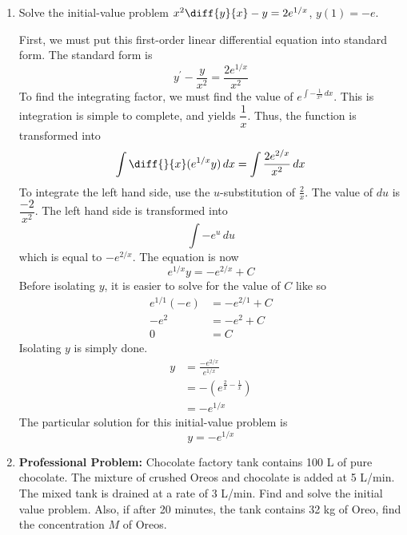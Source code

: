 \documentclass{article}
\begin{document}
\begin{enumerate}[label=\textbf{(3.\arabic*)}]
\newpage

\item Solve the initial-value problem $x^2\diff{y}{x}-y=2e^{1/x}$, $y(1)=-e$.

First, we must put this first-order linear differential equation into standard form. The standard form is
\[y^{\prime} - \frac{y}{x^2}=\frac{2e^{1/x}}{x^2}\]
To find the integrating factor, we must find the value of $\displaystyle e^{\int -\frac{1}{x^2}\,dx}$. This is integration is simple to complete, and yields $\dfrac{1}{x}$. Thus, the function is transformed into
\[\int\diff{ }{x}(e^{1/x}y)\,dx=\int\frac{2e^{2/x}}{x^2}\,dx\]
To integrate the left hand side, use the $u$-substitution of $\frac{2}{x}$. The value of $du$ is $\dfrac{-2}{x^2}$. The left hand side is transformed into 
\[\int -e^u\,du\]
which is equal to $-e^{2/x}$. The equation is now
\[e^{1/x}y=-e^{2/x}+C\]
Before isolating $y$, it is easier to solve for the value of $C$ like so
\begin{align*}
e^{1/1}(-e)&=-e^{2/1}+C\\
-e^2 &= -e^2+C\\
0 &= C
\end{align*}
Isolating $y$ is simply done.
\begin{align*}
y &= \frac{-e^{2/x}}{e^{1/x}}\\
&= -(e^{\frac{2}{x}-\frac{1}{x}})\\
&= -e^{1/x}
\end{align*}
The particular solution for this initial-value problem is 
\[y=-e^{1/x}\]

\newpage

\item \textbf{Professional Problem: } Chocolate factory tank contains 100 L of pure chocolate. The mixture of crushed Oreos and chocolate is added at 5 L/min. The mixed tank is drained at a rate of 3 L/min. Find and solve the initial value problem. Also, if after 20 minutes, the tank contains 32 kg of Oreo, find the concentration $M$ of Oreos.


\end{enumerate}
\end{document}

